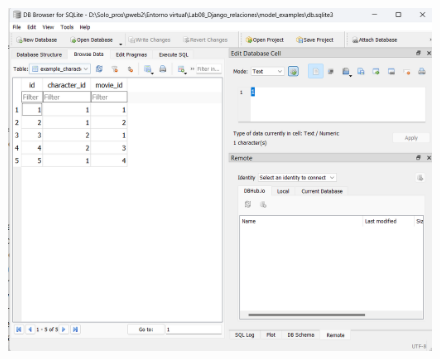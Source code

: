 \documentclass{article}
\begin{document}
	\begin{figure}[H]
		\centering
		\includegraphics[width=1.0\textwidth,keepaspectratio]{img/C5.png}
	\end{figure}	
\end{document}
